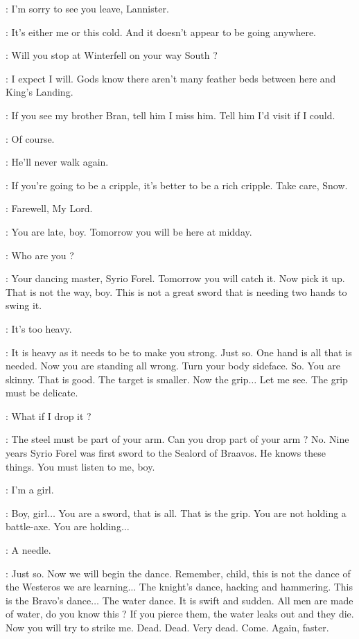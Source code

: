 \JON: I'm sorry to see you leave, Lannister. 

\TYRION: It's either me or this cold. And it doesn't appear to be going anywhere. 

\JON: Will you stop at Winterfell on your way South ? 

\TYRION: I expect I will. Gods know there aren't many feather beds between here and King's Landing. 

\JON: If you see my brother Bran, tell him I miss him. Tell him I'd visit if I could. 

\TYRION: Of course. 

\JON: He'll never walk again. 

\TYRION: If you're going to be a cripple, it's better to be a rich cripple. Take care, Snow. 

\JON: Farewell, My Lord. 

\scene



\SYRIO: You are late, boy. Tomorrow you will be here at midday. 

\ARYA: Who are you ? 

\SYRIO: Your dancing master, Syrio Forel.  Tomorrow you will catch it. Now pick it up.  That is not the way, boy. This is not a great sword that is needing two hands to swing it. 

\ARYA: It's too heavy. 

\SYRIO: It is heavy as it needs to be to make you strong. Just so. One hand is all that is needed. Now you are standing all wrong. Turn your body sideface. So. You are skinny. That is good. The target is smaller. Now the grip$\ldots$ Let me see. The grip must be delicate. 

\ARYA: What if I drop it ? 

\SYRIO: The steel must be part of your arm. Can you drop part of your arm ? No. Nine years Syrio Forel was first sword to the Sealord of Braavos. He knows these things. You must listen to me, boy. 

\ARYA: I'm a girl. 

\SYRIO: Boy, girl$\ldots$ You are a sword, that is all. That is the grip. You are not holding a battle-axe. You are holding$\ldots$ 

\ARYA: A needle. 

\SYRIO: Just so. Now we will begin the dance. Remember, child, this is not the dance of the Westeros we are learning$\ldots$ The knight's dance, hacking and hammering. This is the Bravo's dance$\ldots$ The water dance. It is swift and sudden. All men are made of water, do you know this ? If you pierce them, the water leaks out and they die. Now you will try to strike me.  Dead. Dead. Very dead. Come. Again, faster. 



